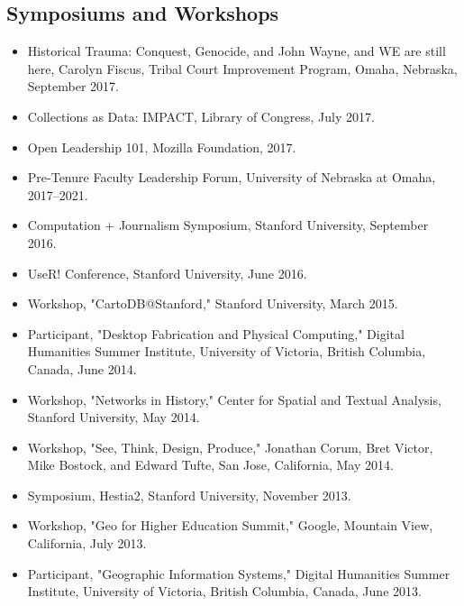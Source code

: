 \documentclass[10pt]{article}
\begin{document}
\subsection*{Symposiums and Workshops}
\begin{itemize}
  \item Historical Trauma: Conquest, Genocide, and John Wayne, and WE are still here, Carolyn Fiscus, Tribal Court Improvement Program, Omaha, Nebraska, September 2017.
  
  \item Collections as Data: IMPACT, Library of Congress, July 2017.
  
  \item Open Leadership 101, Mozilla Foundation, 2017.
  
  \item Pre-Tenure Faculty Leadership Forum, University of Nebraska at Omaha, 2017--2021.
  
  \item Computation + Journalism Symposium, Stanford University, September 2016.
  
  \item UseR! Conference, Stanford University, June 2016.
  
  \item Workshop, "CartoDB@Stanford," Stanford University, March 2015.
  
  \item Participant, "Desktop Fabrication and Physical Computing," Digital Humanities Summer Institute, University of Victoria, British Columbia, Canada, June 2014.
  
  \item Workshop, "Networks in History," Center for Spatial and Textual Analysis, Stanford University, May 2014.
  
  \item Workshop, "See, Think, Design, Produce," Jonathan Corum, Bret Victor, Mike Bostock, and Edward Tufte, San Jose, California, May 2014.
  
  \item Symposium, Hestia2, Stanford University, November 2013.
  
  \item Workshop, "Geo for Higher Education Summit," Google, Mountain View, California, July 2013.
  
  \item Participant, "Geographic Information Systems," Digital Humanities Summer Institute, University of Victoria, British Columbia, Canada, June 2013.
  

\end{itemize}
\end{document}
